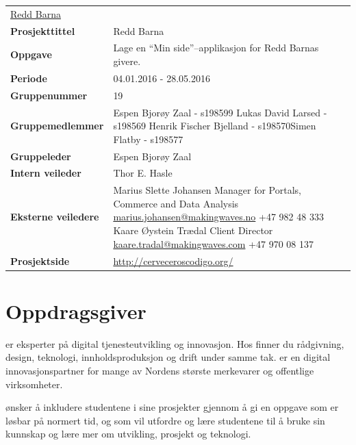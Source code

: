 \begin{flushleft}
\begin{tabular}[ht]{@{}lp{100mm}@{}}
\href{http://www.reddbarna.no/}{Redd Barna} \\
\textbf{Prosjekttittel} & Redd Barna \\ 
\textbf{Oppgave} & Lage en ``Min side''--applikasjon for Redd Barnas givere. \\ 
\textbf{Periode} & 04.01.2016 - 28.05.2016 \\ 
\textbf{Gruppenummer} & 19 \\ 
\textbf{Gruppemedlemmer} & Espen Bjorøy Zaal - s198599 \newline Lukas David Larsed - s198569 \newline Henrik Fischer Bjelland - s198570\newline Simen Flatby - s198577 \\ 
\textbf{Gruppeleder} & Espen Bjorøy Zaal \\ 
\textbf{Intern veileder} & Thor E. Hasle \\ 
\textbf{Eksterne veiledere} & Marius Slette Johansen \newline Manager for Portals, Commerce and Data Analysis \newline \href{mailto:marius.johansen@makingwaves.no}{marius.johansen@makingwaves.no} \newline +47 982 48 333 \newline \newline Kaare Øystein Trædal \newline Client Director \newline \href{mailto:kaare.tradal@makingwaves.com}{kaare.tradal@makingwaves.com} \newline +47 970 08 137 \\
\textbf{Prosjektside} & \url{http://cerveceroscodigo.org/} \\
\end{tabular} 
\end{flushleft}

\pagebreak
\section{Oppdragsgiver}
\mw{} er eksperter på digital tjenesteutvikling og innovasjon. Hos \mw{} finner du rådgivning, design, teknologi, innholdsproduksjon og drift under samme tak. \mw{} er en digital innovasjonspartner for mange av Nordens største merkevarer og offentlige virksomheter.

\mw{} ønsker å inkludere studentene i sine prosjekter gjennom å gi en oppgave som er løsbar på normert tid, og som vil utfordre og lære studentene til å bruke sin kunnskap og lære mer om utvikling, prosjekt og teknologi.


